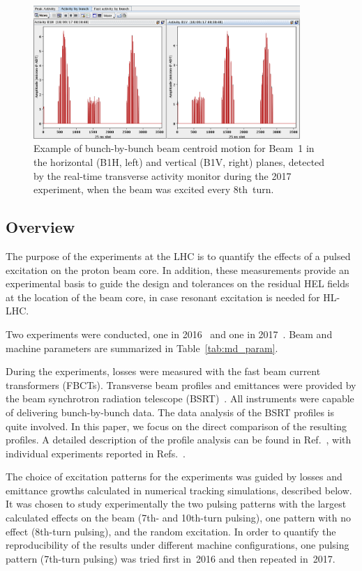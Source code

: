 \documentclass[
prstab
,reprint
,linenumbers
,longbibliography
,preprintnumbers
,showkeys
,amsfonts,amssymb,amsmath
,floatfix
]{revtex4-1}
\newcommand{\seventhtp}{7th-turn pulsing}
\newcommand{\eighthtp}{8th-turn pulsing}
\newcommand{\tenthtp}{10th-turn pulsing}
\begin{document}
\begin{figure}
  \includegraphics[width=0.9\textwidth]{bunchfilling_measured.png}	
  \caption{Example of bunch-by-bunch beam centroid motion for Beam~1
    in the horizontal (B1H, left) and vertical (B1V, right) planes,
    detected by the real-time transverse activity monitor during the
    2017 experiment, when the beam was excited every 8th~turn.}
  \label{fig:fill_meas} 
\end{figure}

\subsection{Overview}
\label{sec:exp_sum}

The purpose of the experiments at the LHC is to quantify the effects
of a pulsed excitation on the proton beam core. In addition, these
measurements provide an experimental basis to guide the design and
tolerances on the residual HEL fields at the location of the beam
core, in case resonant excitation is needed for HL-LHC.

Two experiments were conducted, one in 2016~\cite{resexmd2016} and one
in 2017~\cite{resexmd2017}. Beam and machine parameters are summarized
in Table~\ref{tab:md_param}.

During the experiments, losses were measured with the fast beam
current transformers (FBCTs). Transverse beam profiles and emittances
were provided by the beam synchrotron radiation telescope
(BSRT)~\cite{Trad:PhD:2015}. All instruments were capable of
delivering bunch-by-bunch data. The data analysis of the BSRT profiles
is quite involved. In this paper, we focus on the direct comparison of
the resulting profiles. A detailed description of the profile analysis
can be found in Ref.~\cite{bsrtprofinj}, with individual experiments
reported in Refs.~\cite{resexmd2016, resexmd2017}.

The choice of excitation patterns for the experiments was guided by
losses and emittance growths calculated in numerical tracking
simulations, described below. It was chosen to study experimentally
the two pulsing patterns with the largest calculated effects on the
beam (7th- and \tenthtp), one pattern with no effect (\eighthtp), and
the random excitation. In order to quantify the reproducibility of the
results under different machine configurations, one pulsing pattern
(\seventhtp) was tried first in~2016 and then repeated in~2017.
\end{document}
